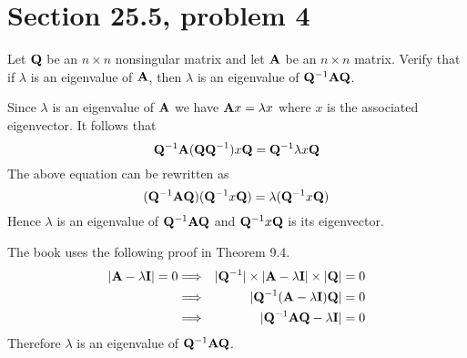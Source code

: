 \section{Section 25.5, problem 4}
Let $\bf Q$ be an $n\times n$ nonsingular matrix and let $\bf A$
be an $n\times n$ matrix.
Verify that if $\lambda$ is an eigenvalue of $\bf A$,
then $\lambda$ is an eigenvalue of ${\bf Q}^{-1}\bf AQ$.

\bigskip
\noindent
Since $\lambda$ is an eigenvalue of $\bf A$ we have
${\bf A}x=\lambda x$ where $x$ is the associated eigenvector.
It follows that
$${\bf Q}^{-1}{\bf A}({\bf QQ}^{-1})x{\bf Q}
={\bf Q}^{-1}\lambda x\bf Q$$
The above equation can be rewritten as
$$({\bf Q}^{-1}{\bf A}{\bf Q})({\bf Q}^{-1}x{\bf Q})
=\lambda({\bf Q}^{-1}x\bf Q)$$
Hence $\lambda$ is an eigenvalue of ${\bf Q}^{-1}\bf AQ$
and ${\bf Q}^{-1}x\bf Q$ is its eigenvector.

\bigskip
\noindent
The book uses the following proof in Theorem 9.4.
\begin{eqnarray*}
|{\bf A}-\lambda{\bf I}|=0
&\Longrightarrow&|{\bf Q}^{-1}|
\times|{\bf A}-\lambda{\bf I}|
\times|{\bf Q}|=0\\
&\Longrightarrow&
|{\bf Q}^{-1}({\bf A}-\lambda{\bf I}){\bf Q}|=0\\
&\Longrightarrow&
|{\bf Q}^{-1}{\bf AQ}-\lambda{\bf I}|=0
\end{eqnarray*}
Therefore $\lambda$ is an eigenvalue of ${\bf Q}^{-1}{\bf AQ}$.
